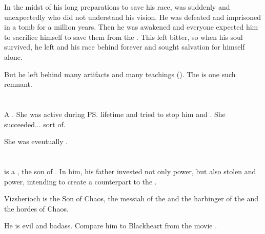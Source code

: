 In the midst of his long preparations to save his race, \Sethicus was suddenly and unexpectedly  who did not understand his vision.
He was defeated and imprisoned in a tomb for a million years.
Then he was awakened and everyone expected him to sacrifice himself to save them from the \banes. 
This left \Sethicus bitter, so when his soul survived, he left \Miith and his race behind forever and sought salvation for himself alone. 

But he left behind many artifacts and many teachings (). 
The  is one such remnant. 















\section{\Vexstrasshin}
\index{\Vexstrasshin}
A \dragon{}. 
She was active during \ps{\Semiza} lifetime and tried to stop him and \Thanatzil. 
She succeeded... sort of. 

She was eventually . 















\section{\Vizsherioch}
\index{\Vizsherioch}
\Vizsherioch{} is a \dragon, the son of \Secherdamon. 
In him, his father invested not only \draconic{} power, but also stolen \bane{} and \resphan{} power, intending to create a \draconic{} counterpart to the \satharioth. 

Vizsherioch is the Son of Chaos, the messiah of the \dragons and the harbinger of the \xs and the hordes of Chaos. 

He is evil and badass. 
Compare him to Blackheart from the movie \cite{Movie:GhostRider}.









